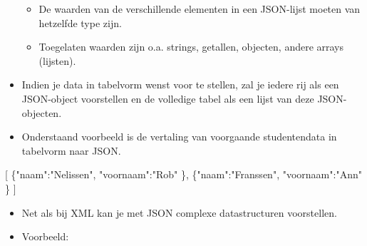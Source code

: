 \documentclass[]{memoir}
\newenvironment{Shaded}{\begin{snugshade}}{\end{snugshade}}
\newcommand{\DataTypeTok}[1]{\textcolor[rgb]{0.13,0.29,0.53}{#1}}
\newcommand{\FunctionTok}[1]{\textcolor[rgb]{0.00,0.00,0.00}{#1}}
\newcommand{\OtherTok}[1]{\textcolor[rgb]{0.56,0.35,0.01}{#1}}
\newcommand{\StringTok}[1]{\textcolor[rgb]{0.31,0.60,0.02}{#1}}
\providecommand{\tightlist}{%
  \setlength{\itemsep}{0pt}\setlength{\parskip}{0pt}}
\begin{document}
\begin{itemize}
  \begin{itemize}
  \tightlist
  \item
    De waarden van de verschillende elementen in een JSON-lijst moeten van hetzelfde type zijn.
  \item
    Toegelaten waarden zijn o.a. strings, getallen, objecten, andere arrays (lijsten).
  \end{itemize}
\item
  Indien je data in tabelvorm wenst voor te stellen, zal je iedere rij als een JSON-object voorstellen en de volledige tabel als een lijst van deze JSON-objecten.
\item
  Onderstaand voorbeeld is de vertaling van voorgaande studentendata in tabelvorm naar JSON.
\end{itemize}

\begin{Shaded}
\begin{Highlighting}[]
\OtherTok{[}
  \FunctionTok{\{}\DataTypeTok{"naam"}\FunctionTok{:}\StringTok{"Nelissen"}\FunctionTok{,} 
   \DataTypeTok{"voornaam"}\FunctionTok{:}\StringTok{"Rob"} 
  \FunctionTok{\}}\OtherTok{,} 
  \FunctionTok{\{}\DataTypeTok{"naam"}\FunctionTok{:}\StringTok{"Franssen"}\FunctionTok{,} 
   \DataTypeTok{"voornaam"}\FunctionTok{:}\StringTok{"Ann"}
  \FunctionTok{\}}
\OtherTok{]}
\end{Highlighting}
\end{Shaded}

\begin{itemize}
\tightlist
\item
  Net als bij XML kan je met JSON complexe datastructuren voorstellen.
\item
  Voorbeeld:
\end{itemize}
\end{document}
